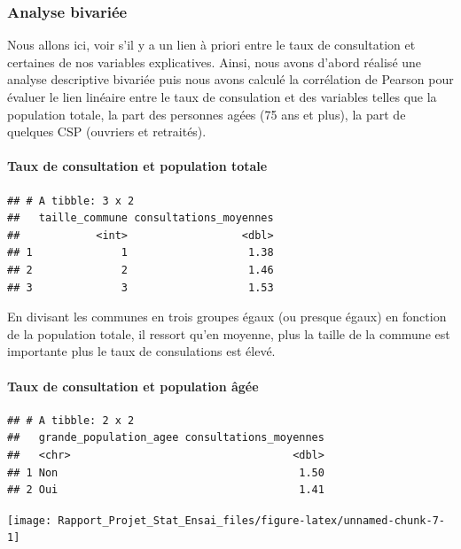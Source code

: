 \documentclass[
]{article}
\begin{document}
\subsubsection{Analyse bivariée}\label{analyse-bivariuxe9e}

Nous allons ici, voir s'il y a un lien à priori entre le taux de
consultation et certaines de nos variables explicatives. Ainsi, nous
avons d'abord réalisé une analyse descriptive bivariée puis nous avons
calculé la corrélation de Pearson pour évaluer le lien linéaire entre le
taux de consulation et des variables telles que la population totale, la
part des personnes agées (75 ans et plus), la part de quelques CSP
(ouvriers et retraités).

\paragraph{Taux de consultation et population
totale}\label{taux-de-consultation-et-population-totale}

\begin{verbatim}
## # A tibble: 3 x 2
##   taille_commune consultations_moyennes
##            <int>                  <dbl>
## 1              1                   1.38
## 2              2                   1.46
## 3              3                   1.53
\end{verbatim}

En divisant les communes en trois groupes égaux (ou presque égaux) en
fonction de la population totale, il ressort qu'en moyenne, plus la
taille de la commune est importante plus le taux de consulations est
élevé.

\paragraph{Taux de consultation et population
âgée}\label{taux-de-consultation-et-population-uxe2guxe9e}

\begin{verbatim}
## # A tibble: 2 x 2
##   grande_population_agee consultations_moyennes
##   <chr>                                   <dbl>
## 1 Non                                      1.50
## 2 Oui                                      1.41
\end{verbatim}

\begin{center}\texttt{[image: Rapport\_Projet\_Stat\_Ensai\_files/figure-latex/unnamed-chunk-7-1]} \end{center}
\end{document}

